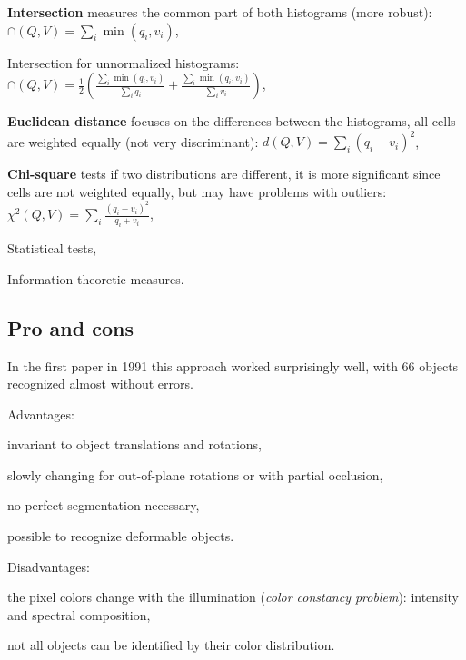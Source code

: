 \begin{myitem}
    \item \textbf{Intersection} measures the common part of both histograms (more robust): $\cap(Q,V) = \sum_i \min\left(q_i, v_i\right)$,
    \item Intersection for unnormalized histograms: $\cap(Q,V) = \frac12 \left( \frac{\sum_i \min\left(q_i, v_i\right)}{\sum_i q_i} + \frac{\sum_i \min\left(q_i, v_i\right)}{\sum_i v_i} \right)$,
    \item \textbf{Euclidean distance} focuses on the differences between the histograms, all cells are weighted equally (not very discriminant): $d(Q,V) = \sum_i \left( q_i - v_i \right)^2$,
    \item \textbf{Chi-square} tests if two distributions are different, it is more significant since cells are not weighted equally, but may have problems with outliers: $\chi^2(Q,V) = \sum_i \frac{\left( q_i - v_i \right)^2}{q_i + v_i}$,
    \item Statistical tests,
    \item Information theoretic measures.
\end{myitem}


\subsection{Pro and cons}\label{sec:h-pro-cons}

In the first paper in 1991 this approach worked surprisingly well, with 66 objects recognized almost without errors.

Advantages:
\begin{myitem}
    \item invariant to object translations and rotations,
    \item slowly changing for out-of-plane rotations or with partial occlusion,
    \item no perfect segmentation necessary,
    \item possible to recognize deformable objects.
\end{myitem}

Disadvantages:
\begin{myitem}
    \item the pixel colors change with the illumination (\textit{color constancy problem}): intensity and spectral composition,
    \item not all objects can be identified by their color distribution.
\end{myitem}
